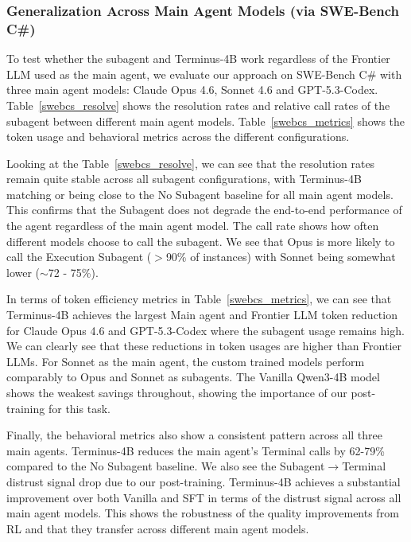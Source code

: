 \documentclass[sigconf,review]{acmart}
\begin{document}
\subsubsection{Generalization Across Main Agent Models (via SWE-Bench C\#)}
To test whether the subagent and Terminus-4B work regardless of the Frontier LLM used as the main agent, we evaluate our approach on SWE-Bench C\# with three main agent models: Claude Opus 4.6, Sonnet 4.6 and GPT-5.3-Codex. Table~\ref{swebcs_resolve} shows the resolution rates and relative call rates of the subagent between different main agent models. Table~\ref{swebcs_metrics} shows the token usage and behavioral metrics across the different configurations.

Looking at the Table~\ref{swebcs_resolve}, we can see that the resolution rates remain quite stable across all subagent configurations, with Terminus-4B matching or being close to the No Subagent baseline for all main agent models. This confirms that the Subagent does not degrade the end-to-end performance of the agent regardless of the main agent model. The call rate shows how often different models choose to call the subagent. We see that Opus is more likely to call the Execution Subagent ($>$90\% of instances) with Sonnet being somewhat lower ($\sim$72 - 75\%).

In terms of token efficiency metrics in Table~\ref{swebcs_metrics}, we can see that Terminus-4B achieves the largest Main agent and Frontier LLM token reduction for Claude Opus 4.6 and GPT-5.3-Codex where the subagent usage remains high. We can clearly see that these reductions in token usages are higher than Frontier LLMs. For Sonnet as the main agent, the custom trained models perform comparably to Opus and Sonnet as subagents. The Vanilla Qwen3-4B model shows the weakest savings throughout, showing the importance of our post-training for this task.

Finally, the behavioral metrics also show a consistent pattern across all three main agents. Terminus-4B reduces the main agent's Terminal calls by 62-79\% compared to the No Subagent baseline. We also see the Subagent$\to$Terminal distrust signal drop due to our post-training. Terminus-4B achieves a substantial improvement over both Vanilla and SFT in terms of the distrust signal across all main agent models. This shows the robustness of the quality improvements from RL and that they transfer across different main agent models.
\end{document}
